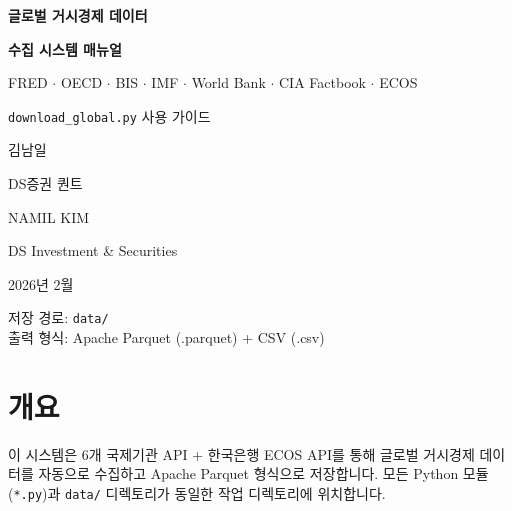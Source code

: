 \documentclass[11pt,a4paper]{article}
\newcommand{\code}[1]{\texttt{#1}}
\begin{document}
\begin{titlepage}
\centering
\vspace*{4cm}

{\Huge\bfseries\textcolor{accent}{글로벌 거시경제 데이터}\par}
\vspace{0.5cm}
{\Huge\bfseries\textcolor{accent}{수집 시스템 매뉴얼}\par}

\vspace{2cm}

{\Large FRED $\cdot$ OECD $\cdot$ BIS $\cdot$ IMF $\cdot$ World Bank $\cdot$ CIA Factbook $\cdot$ ECOS\par}

\vspace{3cm}

{\large \code{download\_global.py} 사용 가이드\par}

\vspace{2cm}

{\large 김남일\par}
{\normalsize DS증권 퀀트\par}
\vspace{0.3cm}
{\large NAMIL KIM\par}
{\normalsize DS Investment \& Securities\par}

\vspace{1.5cm}

{\large 2026년 2월\par}

\vfill

{\normalsize
저장 경로: \code{data/}\\[0.3em]
출력 형식: Apache Parquet (.parquet) + CSV (.csv)
}
\end{titlepage}

\newpage
\tableofcontents
\newpage


\section{개요}

이 시스템은 6개 국제기관 API + 한국은행 ECOS API를 통해 글로벌 거시경제 데이터를
자동으로 수집하고 Apache Parquet 형식으로 저장합니다.
모든 Python 모듈(\code{*.py})과 \code{data/} 디렉토리가 동일한 작업 디렉토리에 위치합니다.
\end{document}
